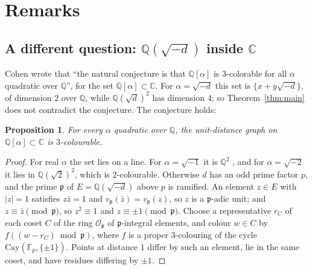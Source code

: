\documentclass[11pt,a4paper]{amsart}
\newtheorem{proposition}[theorem]{Proposition}
\theoremstyle{remark}
\newcommand{\F}{\mathbb{F}}
\newcommand{\Q}{\mathbb{Q}}
\newcommand{\C}{\mathbb{C}}
\newcommand{\p}{\mathfrak{p}}
\begin{document}
\section{Remarks}

\subsection*{A different question: \texorpdfstring{$\Q(\sqrt{-d})$ inside $\C$}{Q(sqrt(-d)) inside C}}
Cohen \cite{Cohen} wrote that ``the natural conjecture is that $\Q[\alpha]$ is $3$-colorable for all $\alpha$
quadratic over $\Q$'', for the set $\Q[\alpha]\subset\C$. For $\alpha=\sqrt{-d}$ this set is
$\{x+y\sqrt{-d}\}$, of dimension $2$ over $\Q$, while $\Q(\sqrt d)^2$ has dimension $4$; so
Theorem~\ref{thm:main} does not contradict the conjecture. The conjecture holds:

\begin{proposition}
For every $\alpha$ quadratic over $\Q$, the unit-distance graph on $\Q[\alpha]\subset\C$ is $3$-colourable.
\end{proposition}

\begin{proof}
For real $\alpha$ the set lies on a line. For $\alpha=\sqrt{-1}$ it is $\Q^2$ \cite{Woodall}, and for
$\alpha=\sqrt{-2}$ it lies in $\Q(\sqrt2)^2$, which is $2$-colourable. Otherwise $d$ has an odd prime factor
$p$, and the prime $\p$ of $E=\Q(\sqrt{-d})$ above $p$ is ramified. An element $z\in E$ with $|z|=1$
satisfies $z\bar z=1$ and $v_\p(\bar z)=v_\p(z)$, so $z$ is a $\p$-adic unit; and $z\equiv\bar z\pmod\p$, so $z^2\equiv1$ and
$z\equiv\pm1\pmod\p$. Choose a representative $r_C$ of each coset $C$ of the ring $\mathcal O_\p$ of
$\p$-integral elements, and colour $w\in C$ by $f((w-r_C)\bmod\p)$, where $f$ is a proper $3$-colouring of the
cycle $\mathrm{Cay}(\F_p,\{\pm1\})$. Points at distance $1$ differ by such an element, lie in the same coset,
and have residues differing by $\pm1$.
\end{proof}
\end{document}
